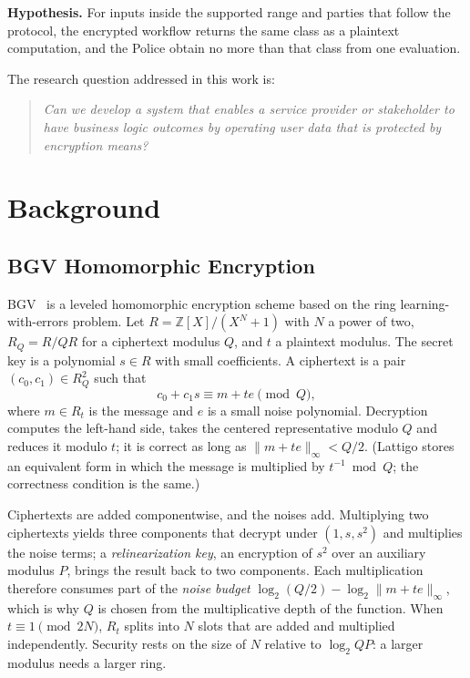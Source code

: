 \documentclass[conference,letterpaper]{IEEEtran}
\begin{document}
\textbf{Hypothesis.} For inputs inside the supported range and parties that follow the protocol, the encrypted workflow returns the same class as a plaintext computation, and the Police obtain no more than that class from one evaluation.

The research question addressed in this work is:
\begin{quote}
\itshape Can we develop a system that enables a service provider or stakeholder to have business logic outcomes by operating user data that is protected by encryption means?
\end{quote}

\section{Background}
\subsection{BGV Homomorphic Encryption}
BGV~\cite{bgv} is a leveled homomorphic encryption scheme based on the ring learning-with-errors problem. Let $R = \mathbb{Z}[X]/(X^N+1)$ with $N$ a power of two, $R_Q = R/QR$ for a ciphertext modulus $Q$, and $t$ a plaintext modulus. The secret key is a polynomial $s \in R$ with small coefficients. A ciphertext is a pair $(c_0, c_1) \in R_Q^2$ such that
\begin{equation}
c_0 + c_1 s \equiv m + t e \pmod{Q},
\label{eq:bgv}
\end{equation}
where $m \in R_t$ is the message and $e$ is a small noise polynomial. Decryption computes the left-hand side, takes the centered representative modulo $Q$ and reduces it modulo $t$; it is correct as long as $\lVert m + te \rVert_\infty < Q/2$. (Lattigo stores an equivalent form in which the message is multiplied by $t^{-1} \bmod Q$; the correctness condition is the same.)

Ciphertexts are added componentwise, and the noises add. Multiplying two ciphertexts yields three components that decrypt under $(1, s, s^2)$ and multiplies the noise terms; a \emph{relinearization key}, an encryption of $s^2$ over an auxiliary modulus $P$, brings the result back to two components. Each multiplication therefore consumes part of the \emph{noise budget} $\log_2(Q/2) - \log_2 \lVert m + te \rVert_\infty$, which is why $Q$ is chosen from the multiplicative depth of the function. When $t \equiv 1 \pmod{2N}$, $R_t$ splits into $N$ slots that are added and multiplied independently. Security rests on the size of $N$ relative to $\log_2 QP$: a larger modulus needs a larger ring.
\end{document}
